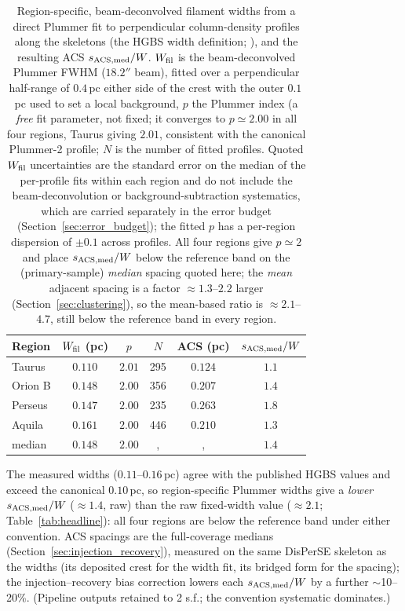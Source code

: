 \documentclass[usenatbib,twoside,twocolumn]{mnras}
\begin{document}
\begin{table}
\caption{Region-specific, beam-deconvolved filament widths from a direct Plummer fit to perpendicular column-density profiles along the skeletons (the HGBS width definition; \citealt{Arzoumanian2019}), and the resulting ACS $s_{\rm ACS,med}/W$. $W_{\rm fil}$ is the beam-deconvolved Plummer FWHM ($18.2''$ beam), fitted over a perpendicular half-range of $0.4$\,pc either side of the crest with the outer $0.1$\,pc used to set a local background, $p$ the Plummer index (a \emph{free} fit parameter, not fixed; it converges to $p\simeq2.00$ in all four regions, Taurus giving $2.01$, consistent with the canonical Plummer-2 profile; $N$ is the number of fitted profiles. Quoted $W_{\rm fil}$ uncertainties are the standard error on the median of the per-profile fits within each region and do not include the beam-deconvolution or background-subtraction systematics, which are carried separately in the error budget (Section~\ref{sec:error_budget}); the fitted $p$ has a per-region dispersion of $\pm0.1$ across profiles. All four regions give $p\simeq2$ and place $s_{\rm ACS,med}/W$ below the reference band on the (primary-sample) \emph{median} spacing quoted here; the \emph{mean} adjacent spacing is a factor $\approx1.3$--$2.2$ larger (Section~\ref{sec:clustering}), so the mean-based ratio is $\approx2.1$--$4.7$, still below the reference band in every region.}
\label{tab:widths}
\footnotesize
\setlength{\tabcolsep}{3pt}
\begin{tabular}{p{1.7cm}ccccc}
\toprule
Region & $W_{\rm fil}$ (pc) & $p$ & $N$ & ACS (pc) & $s_{\rm ACS,med}/W$ \\
\midrule
Taurus  & $0.110$ & $2.01$ & 295 & $0.124$ & $1.1$ \\
Orion B & $0.148$ & $2.00$ & 356 & $0.207$ & $1.4$ \\
Perseus & $0.147$ & $2.00$ & 235 & $0.263$ & $1.8$ \\
Aquila  & $0.161$ & $2.00$ & 446 & $0.210$ & $1.3$ \\
\midrule
median  & $0.148$ & $2.00$ &, &, & $1.4$ \\
\bottomrule
\end{tabular}
\par\vspace{2pt}
\footnotesize The measured widths ($0.11$--$0.16$\,pc) agree with the published HGBS values and exceed the canonical $0.10$\,pc, so region-specific Plummer widths give a \emph{lower} $s_{\rm ACS,med}/W$ ($\approx1.4$, raw) than the raw fixed-width value ($\approx2.1$; Table~\ref{tab:headline}): all four regions are below the reference band under either convention. ACS spacings are the full-coverage medians (Section~\ref{sec:injection_recovery}), measured on the same DisPerSE skeleton as the widths (its deposited crest for the width fit, its bridged form for the spacing); the injection--recovery bias correction lowers each $s_{\rm ACS,med}/W$ by a further $\sim$10--20\%. (Pipeline outputs retained to 2 s.f.; the convention systematic dominates.)
\end{table}
\label{sec:decoder}
\end{document}

